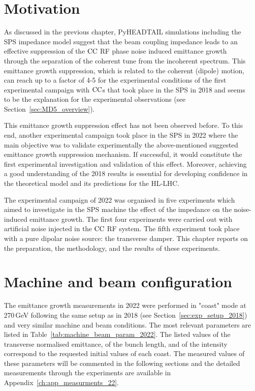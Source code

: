 \section{Motivation}\label{sec:motivation_md_2022}
As discussed in the previous chapter, PyHEADTAIL simulations including the SPS impedance model suggest that the beam coupling impedance leads to an effective suppression of the ${\mathrm{CC}}$ RF phase noise induced emittance growth through the separation of the coherent tune from the incoherent spectrum. This emittance growth suppression, which is related to the coherent (dipole) motion, can reach up to a factor of 4-5 for the experimental conditions of the first experimental campaign with ${\mathrm{CC}}$s that took place in the SPS in 2018 and seems to be the explanation for the experimental observations (see Section~\ref{sec:MD5_overview}).

This emittance growth suppression effect has not been observed before. To this end, another experimental campaign took place in the SPS in 2022 where the main objective was to validate experimentally the above-mentioned suggested emittance growth suppression mechanism. If successful, it would constitute the first experimental investigation and validation of this effect. Moreover, achieving a good understanding of the 2018 results is essential for developing confidence in the theoretical model and its predictions for the HL-LHC.

The experimental campaign of 2022 was organised in five experiments which aimed to investigate in the SPS machine the effect of the impedance on the noise-induced emittance growth. The first four experiments were carried out with artificial noise injected in the ${\mathrm{CC}}$ RF system. The fifth experiment took place with a pure dipolar noise source: the transverse damper. This chapter reports on the preparation, the methodology, and the results of these experiments.



\section{Machine and beam configuration}\label{sec:cc_md_2022_parameters}
The emittance growth measurements in 2022 were performed in "coast" mode at 270\,GeV following the same setup as in 2018 (see Section~\ref{sec:exp_setup_2018}) and very similar machine and beam conditions. The most relevant parameters are listed in Table~\ref{tab:machine_beam_param_2022}. The listed values of the transverse normalised emittance, of the bunch length, and of the intensity correspond to the requested initial values of each coast. The measured values of these parameters will be commented in the following sections and the detailed measurements through the experiments are available in Appendix~\ref{ch:app_measurments_22}. 

